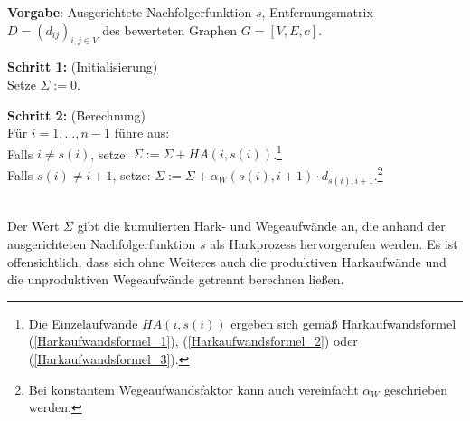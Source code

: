 \begin{algo}
\label{Algo_Berechnung_von_HA_und_HW}
\textbf{Vorgabe}: Ausgerichtete Nachfolgerfunktion $s$, Entfernungsmatrix $D=(d_{ij})_{i,j \in V}$ des bewerteten Graphen $G=[V,E,c]$.

\noindent 
\textbf{Schritt 1:} (Initialisierung)\\
\phantom \quad Setze $\Sigma := 0$.

\noindent 
\textbf{Schritt 2:} (Berechnung)\\
\phantom \quad Für $i=1,\dots,n-1$ führe aus:\\
\phantom \quad \qquad Falls $i \neq s(i)$, setze: $\Sigma := \Sigma + HA(i,s(i))$.\footnote{Die Einzelaufwände $HA(i,s(i))$ ergeben sich gemäß Harkaufwandsformel (\ref{Harkaufwandsformel_1}), (\ref{Harkaufwandsformel_2}) oder (\ref{Harkaufwandsformel_3}).}\\
\phantom \quad \qquad Falls $s(i) \neq i+1$, setze: $\Sigma := \Sigma + \alpha_W(s(i),i+1)\cdot d_{s(i),i+1}$.\footnote{Bei konstantem Wegeaufwandsfaktor kann auch vereinfacht $\alpha_W$ geschrieben werden.}
\end{algo}

\phantom \\
\noindent Der Wert $\Sigma$ gibt die kumulierten Hark- und Wegeaufwände an, die anhand der ausgerichteten Nachfolgerfunktion $s$ als Harkprozess hervorgerufen werden. Es ist offensichtlich, dass sich ohne Weiteres auch die produktiven Harkaufwände und die unproduktiven Wegeaufwände getrennt berechnen ließen.\\


